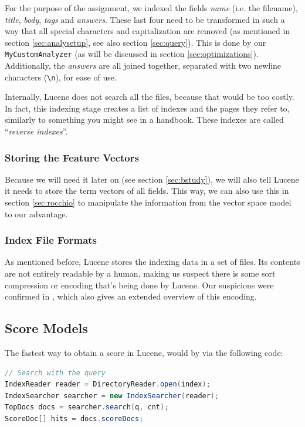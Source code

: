 \documentclass[11pt]{article}
\begin{document}
For the purpose of the assignment, we indexed the fields \textit{name} (i.e. the filename), \textit{title}, \textit{body}, \textit{tags} and \textit{answers}. These last four need to be transformed in such a way that all special characters and capitalization are removed (as mentioned in section \ref{sec:analysetup}, see also section \ref{sec:query}). This is done by our \texttt{MyCustomAnalyzer} (as will be discussed in section \ref{sec:optimizations}). Additionally, the \textit{answers} are all joined together, separated with two newline characters (\texttt{\textbackslash n}), for ease of use.

Internally, Lucene does not search all the files, because that would be too costly. In fact, this indexing stage creates a list of indexes and the pages they refer to, similarly to something you might see in a handbook. These indexes are called ``\textit{reverse indexes}''. \cite{lucene-tutorial}

\subsubsection{Storing the Feature Vectors}\label{sec:fv}
Because we will need it later on (see section \ref{sec:bstudy}), we will also tell Lucene it needs to store the term vectors of all fields. This way, we can also use this in section \ref{sec:rocchio} to manipulate the information from the vector space model to our advantage.

\subsubsection{Index File Formats}
As mentioned before, Lucene stores the indexing data in a set of files. Its contents are not entirely readable by a human, making us suspect there is some sort compression or encoding that's being done by Lucene. Our suspicions were confirmed in \cite{lucene}, which also gives an extended overview of this encoding.

\subsection{Score Models}
The fastest way to obtain a score in Lucene, would by via the following code:
\begin{lstlisting}[language=Java]
// Search with the query
IndexReader reader = DirectoryReader.open(index);
IndexSearcher searcher = new IndexSearcher(reader);
TopDocs docs = searcher.search(q, cnt);
ScoreDoc[] hits = docs.scoreDocs;
\end{lstlisting}
\end{document}
